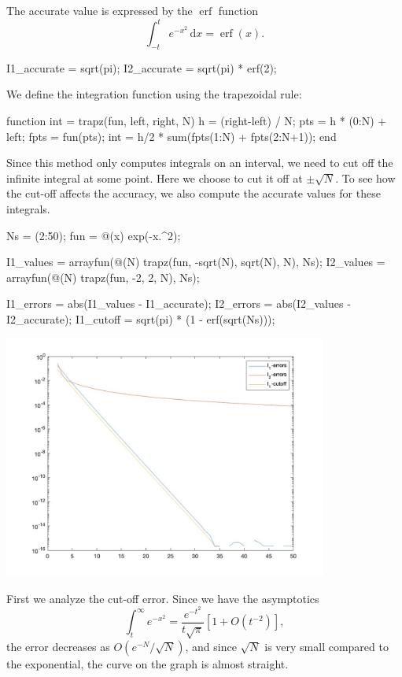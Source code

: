 \documentclass{homework}
\begin{document}
\begin{problem}
The accurate value is expressed by the \(\operatorname{erf}\)
function
\[\int_{-t}^t e^{-x^2}\,\mathrm dx
= \operatorname{erf}(x).\]
\begin{matlab}
I1_accurate = sqrt(pi);
I2_accurate = sqrt(pi) * erf(2);
\end{matlab}
We define the integration function using the
trapezoidal rule:
\begin{matlab}
function int = trapz(fun, left, right, N)
    h = (right-left) / N;
    pts = h * (0:N) + left;
    fpts = fun(pts);
    int = h/2 * sum(fpts(1:N) + fpts(2:N+1));
end
\end{matlab}
Since this method only computes integrals on an
interval, we need to cut off the infinite
integral at some point. Here we choose to cut
it off at \(\pm\sqrt N\). To see how the cut-off
affects the accuracy, we also compute the accurate
values for these integrals.
\begin{matlab}
Ns = (2:50); fun = @(x) exp(-x.^2);

I1_values = arrayfun(@(N) trapz(fun, -sqrt(N), sqrt(N), N), Ns);
I2_values = arrayfun(@(N) trapz(fun, -2, 2, N), Ns);

I1_errors = abs(I1_values - I1_accurate);
I2_errors = abs(I2_values - I2_accurate);
I1_cutoff = sqrt(pi) * (1 - erf(sqrt(Ns)));
\end{matlab}
\begin{center}
\includegraphics[width=0.8\textwidth]{Hw1-Fig3.jpg}
\end{center}

First we analyze the cut-off error.
Since we have the asymptotics
\[\int_{t}^\infty e^{-x^2} =
\frac{e^{-t^2}}{t\sqrt\pi}
\left[1 + O(t^{-2})\right],\]
the error decreases as \(O(e^{-N}/\sqrt N)\),
and since \(\sqrt N\) is very small compared to
the exponential, the curve on the graph is
almost straight.


\end{problem}
\end{document}
